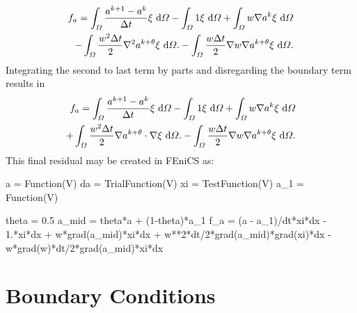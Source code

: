 \begin{align*}
  f_a = \int_{\varOmega} \frac{a^{k+1} - a^{k}}{\Delta t}\xi \ \mathrm{d}\varOmega - 
      \int_{\varOmega} 1\xi \ \mathrm{d}\varOmega
  + \int_{\varOmega} w \nabla{a}^k \xi \ \mathrm{d}\varOmega \\
  - \int_{\varOmega} \frac{w^2 \Delta t}{2} 
    \nabla^2 a^{k+\theta} \xi \ \mathrm{d}\varOmega.
  - \int_{\varOmega} \frac{w \Delta t}{2} 
    \nabla w \nabla a^{k+\theta} \xi \ \mathrm{d}\varOmega.
\end{align*}
Integrating the second to last term by parts and disregarding the boundary term results in
\begin{align*}
  f_a = \int_{\varOmega} \frac{a^{k+1} - a^{k}}{\Delta t}\xi \ \mathrm{d}\varOmega - 
      \int_{\varOmega} 1\xi \ \mathrm{d}\varOmega
  + \int_{\varOmega} w \nabla{a}^k \xi \ \mathrm{d}\varOmega \\
  + \int_{\varOmega} \frac{w^2 \Delta t}{2} 
    \nabla a^{k+\theta} \cdot \nabla \xi \ \mathrm{d}\varOmega.
  - \int_{\varOmega} \frac{w \Delta t}{2} 
    \nabla w \nabla a^{k+\theta} \xi \ \mathrm{d}\varOmega.
\end{align*}
This final residual may be created in FEniCS as:

\begin{python}
a     = Function(V)
da    = TrialFunction(V)
xi    = TestFunction(V)
a_1   = Function(V)

theta = 0.5
a_mid = theta*a + (1-theta)*a_1
f_a   = (a - a_1)/dt*xi*dx 
        - 1.*xi*dx 
        + w*grad(a_mid)*xi*dx 
        + w**2*dt/2*grad(a_mid)*grad(xi)*dx 
        - w*grad(w)*dt/2*grad(a_mid)*xi*dx
\end{python}


\section{Boundary Conditions}

